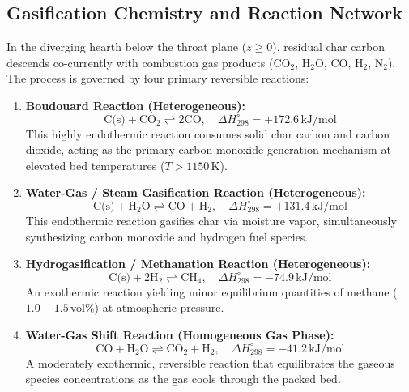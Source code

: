 \documentclass[11pt,a4paper]{article}
\begin{document}
\subsection{Gasification Chemistry and Reaction Network}
In the diverging hearth below the throat plane ($z \ge 0$), residual char carbon descends co-currently with combustion gas products (CO$_2$, H$_2$O, CO, H$_2$, N$_2$). The process is governed by four primary reversible reactions:

\begin{enumerate}[leftmargin=2.0em]
    \item \textbf{Boudouard Reaction (Heterogeneous):}
    \begin{equation}
        \text{C(s)} + \text{CO}_2 \rightleftharpoons 2\text{CO}, \quad \Delta H^\circ_{298} = +172.6\,\text{kJ/mol}
        \label{eq:boudouard}
    \end{equation}
    This highly endothermic reaction consumes solid char carbon and carbon dioxide, acting as the primary carbon monoxide generation mechanism at elevated bed temperatures ($T > 1150$\,K).

    \item \textbf{Water-Gas / Steam Gasification Reaction (Heterogeneous):}
    \begin{equation}
        \text{C(s)} + \text{H}_2\text{O} \rightleftharpoons \text{CO} + \text{H}_2, \quad \Delta H^\circ_{298} = +131.4\,\text{kJ/mol}
        \label{eq:watergas}
    \end{equation}
    This endothermic reaction gasifies char via moisture vapor, simultaneously synthesizing carbon monoxide and hydrogen fuel species.

    \item \textbf{Hydrogasification / Methanation Reaction (Heterogeneous):}
    \begin{equation}
        \text{C(s)} + 2\text{H}_2 \rightleftharpoons \text{CH}_4, \quad \Delta H^\circ_{298} = -74.9\,\text{kJ/mol}
        \label{eq:hydrogas}
    \end{equation}
    An exothermic reaction yielding minor equilibrium quantities of methane ($1.0 - 1.5$\,vol\%) at atmospheric pressure.

    \item \textbf{Water-Gas Shift Reaction (Homogeneous Gas Phase):}
    \begin{equation}
        \text{CO} + \text{H}_2\text{O} \rightleftharpoons \text{CO}_2 + \text{H}_2, \quad \Delta H^\circ_{298} = -41.2\,\text{kJ/mol}
        \label{eq:wgshift}
    \end{equation}
    A moderately exothermic, reversible reaction that equilibrates the gaseous species concentrations as the gas cools through the packed bed.
\end{enumerate}
\end{document}

